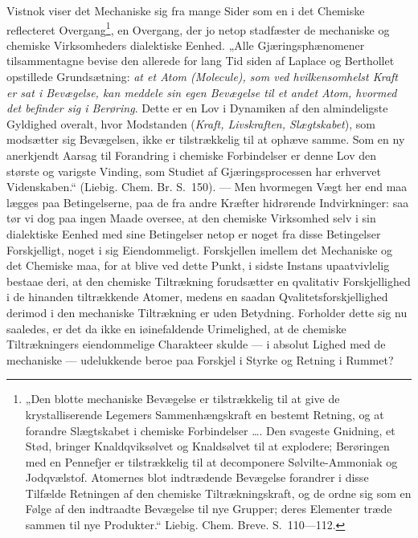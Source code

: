 \documentclass[12pt,a4paper]{book}
\begin{document}
Vistnok viser det Mechaniske sig fra mange Sider som en i det
Chemiske reflecteret Overgang\footnote{„Den blotte mechaniske
Bevægelse er tilstrækkelig til at give de krystalliserende
Legemers Sammenhængskraft en bestemt Retning,
og at forandre Slægtskabet i chemiske Forbindelser \ldots. Den
svageste Gnidning, et Stød, bringer Knaldqviksølvet og
Knaldsølvet til at explodere; Berøringen med en Pennefjer er
tilstrækkelig til at decomponere Sølvilte-Ammoniak og
Jodqvælstof. Atomernes blot indtrædende Bevægelse forandrer
i disse Tilfælde Retningen af den chemiske Tiltrækningskraft,
og de ordne sig som en Følge af den indtraadte Bevægelse til
nye Grupper; deres Elementer træde sammen til nye
Produkter.“ Liebig. Chem. Breve. S.~110---112.}, en Overgang,
der jo netop
stadfæster de mechaniske og chemiske Virksomheders dialektiske
Eenhed. „Alle Gjæringsphænomener tilsammentagne bevise den
allerede for lang Tid siden af Laplace og Berthollet opstillede
Grundsætning: \emph{at et Atom (\textit{Molecule}), som ved
hvilkensomhelst Kraft er sat i Bevægelse, kan meddele sin egen
Bevægelse til et andet Atom, hvormed det befinder sig i
Berøring}. Dette er en Lov i Dynamiken
af den almindeligste Gyldighed overalt, hvor Modstanden
(\emph{Kraft, Livskraften, Slægtskabet}), som modsætter sig
Bevægelsen, ikke er tilstrækkelig til at ophæve samme. Som
en ny anerkjendt Aarsag til Forandring i chemiske Forbindelser
er denne Lov den største og varigste Vinding, som Studiet
af Gjæringsprocessen har erhvervet Videnskaben.“ (Liebig.
Chem. Br. S.~150). --- Men hvormegen Vægt her end
maa lægges paa Betingelserne, paa de fra andre Kræfter
hidrørende Indvirkninger: saa tør vi dog paa ingen Maade
oversee, at den chemiske Virksomhed selv i sin dialektiske
Eenhed med sine Betingelser netop er noget fra disse Betingelser
Forskjelligt, noget i sig Eiendommeligt. Forskjellen imellem
det Mechaniske og det Chemiske maa, for at blive ved dette
Punkt, i sidste Instans upaatvivlelig bestaae deri, at den
chemiske Tiltrækning forudsætter en qvalitativ Forskjellighed i
de hinanden tiltrækkende Atomer, medens en saadan
Qvalitetsforskjellighed derimod i den mechaniske Tiltrækning er uden
Betydning. Forholder dette sig nu saaledes, er det da ikke en
iøinefaldende Urimelighed, at de chemiske Tiltrækningers
eiendommelige Charakteer skulde --- i absolut Lighed med de
mechaniske --- udelukkende beroe paa Forskjel i Styrke og
Retning i Rummet?
\end{document}
